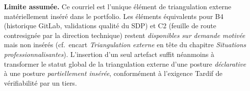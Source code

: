 \medskip
\noindent\textbf{Limite assumée.} Ce courriel est l'unique élément de triangulation externe matériellement inséré dans le portfolio. Les éléments équivalents pour B4 (historique GitLab, validations qualité du SDP) et C2 (feuille de route contresignée par la direction technique) restent \emph{disponibles sur demande motivée} mais non insérés (cf.~encart \emph{Triangulation externe} en tête du chapitre \textit{Situations professionnalisantes}). L'insertion d'un seul artefact suffit néanmoins à transformer le statut global de la triangulation externe d'une posture \emph{déclarative} à une posture \emph{partiellement insérée}, conformément à l'exigence Tardif de vérifiabilité par un tiers.

\clearpage

